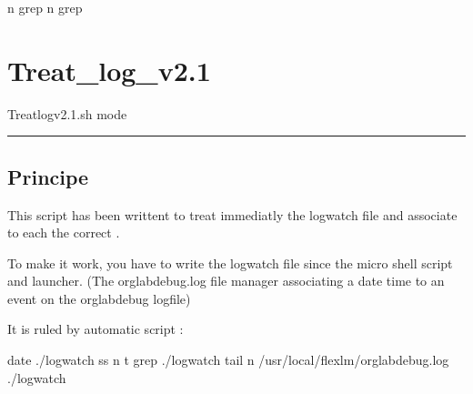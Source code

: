\documentclass[letterpaper,10pt,english]{sphinxmanual}
\begin{document}
\begin{sphinxVerbatim}[commandchars=\\\{\}]
                 
                         \PYG{o}{[}\PYG{o}{[} \PYGZhy{}n    grep  \PYG{o}{]}\PYG{o}{]}
                                 
                 
                         \PYG{o}{[}\PYG{o}{[} \PYGZhy{}n    grep  \PYG{o}{]}\PYG{o}{]}
                                 
\end{sphinxVerbatim}

\sphinxstepscope


\chapter{Treat\_log\_v2.1}
\label{\detokenize{Treat_log_v2.1:treat-log-v2-1}}\label{\detokenize{Treat_log_v2.1::doc}}
\begin{sphinxVerbatim}[commandchars=\\\{\}]
Treat\PYGZus{}log\PYGZus{}v2.1.sh \PYGZlt{}mode\PYGZgt{}
\end{sphinxVerbatim}


\bigskip\hrule\bigskip


\newpage
\section{Principe}
\label{\detokenize{Treat_log_v2.1:principe}}
\sphinxAtStartPar
This script has been writtent to treat immediatly the logwatch file and associate to each  the correct .

\sphinxAtStartPar
To make it work, you have to write the logwatch file since the micro shell script and launcher.
(The orglabdebug.log file manager associating a date time to an event on the orglabdebug logfile)

\sphinxAtStartPar
It is ruled by automatic script :

\begin{sphinxVerbatim}[commandchars=\\\{\}]
date \PYGZgt{}\PYGZgt{} ./logwatch
ss \PYGZhy{}n \PYGZhy{}t  grep  \PYGZgt{}\PYGZgt{} ./logwatch
tail \PYGZhy{}n  /usr/local/flexlm/orglabdebug.log \PYGZgt{}\PYGZgt{} ./logwatch
\end{sphinxVerbatim}
\end{document}
